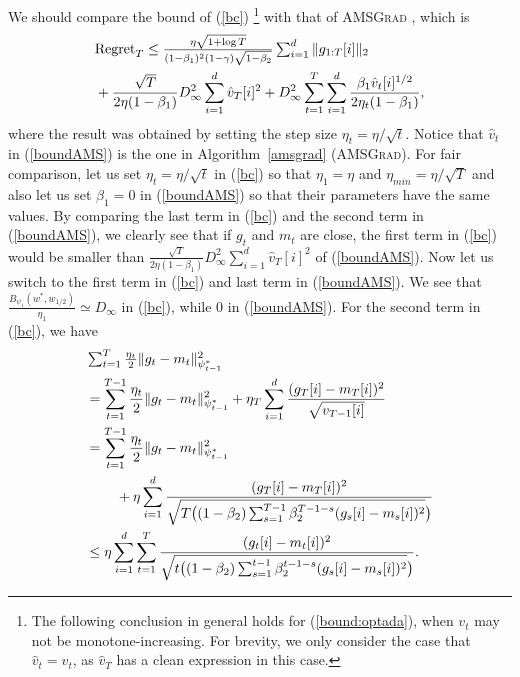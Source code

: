 \documentclass[11pt]{article}
\theoremstyle{k}
\begin{document}
We should compare the bound of (\ref{bc}) \footnote{The following conclusion in general holds for (\ref{bound:optada}), when $v_t$ may not be monotone-increasing. For brevity, we only consider the case that $\hat{v}_t=v_t$, as $\hat{v}_T$ has a clean expression in this case.}
 with that of \textsc{AMSGrad} \cite{RKK18},
which is 
\textit{
\begin{equation} \label{boundAMS}
\begin{aligned}
\textstyle
& \textstyle
 \text{Regret}_T \leq
\textstyle
 \frac{ \eta \sqrt{ 1 + \log T}    }{ (1-\beta_1)^2(1 - \gamma) \sqrt{1 - \beta_2}  } \sum_{i=1}^d \| g_{1:T}[i]  \|_2\\
 &+\frac{\sqrt{T}}{2 \eta (1 - \beta_{1})}
D^2_{\infty} \sum_{i=1}^d \hat{v}_T[i]^2 
 + 
D^2_{\infty} \sum_{t=1}^T \sum_{i=1}^d
\frac{\beta_{1} \hat{v}_t[i]^{1/2} }{2 \eta_t (1-\beta_1)},
\end{aligned}
\end{equation}
}
where the result was obtained by setting the step size $\eta_t = \eta /\sqrt{t}$. 
Notice that $\hat{v}_t$ in (\ref{boundAMS}) is the one in Algorithm~\ref{amsgrad} (\textsc{AMSGrad}).
For fair comparison, let us set $\eta_t=\eta/\sqrt{t}$ in (\ref{bc}) so that $\eta_1=\eta$ and $\eta_{min}= \eta/ \sqrt{T}$ and also let us set $\beta_{1}=0$ in (\ref{boundAMS}) so that their parameters have the same values.
By comparing the last term in (\ref{bc}) and the second term in (\ref{boundAMS}),
we clearly see that if $g_{t}$ and $m_{t}$ are close, the first term in (\ref{bc}) would be 
smaller than $\frac{\sqrt{T}}{2 \eta (1 - \beta_{1})} D^2_{\infty} \sum_{i=1}^d \hat{v}_T[i]^2$
of (\ref{boundAMS}).
Now let us switch to the first term in (\ref{bc}) and last term in (\ref{boundAMS}). We
see that $\frac{ B_{\psi_1}(w^*, w_{1/2}) 
}{\eta_1} \simeq D_{\infty}$ in (\ref{bc}), while $0$ in (\ref{boundAMS}).
For the second term in (\ref{bc}), we have
\begin{align*}
    &\textstyle \sum_{t=1}^T \frac{\eta_t}{2} \|g_t - m_t  \|_{\psi_{t-1}^*}^2\\
    &=\sum_{t=1}^{T-1} \frac{\eta_t}{2} \|g_t - m_t  \|_{\psi_{t-1}^*}^2
    + \eta_T \sum_{i=1}^d \frac{ (g_{T}[i] - m_{T}[i])^2 }{ \sqrt{ v_{T-1}[i]} }\\
    &=\sum_{t=1}^{T-1} \frac{\eta_t}{2} \|g_t - m_t  \|_{\psi_{t-1}^*}^2
    \\
    &\hspace{0.3in}+ \eta \sum_{i=1}^d \frac{ (g_{T}[i] - m_{T}[i])^2 }{ \sqrt{ T \big( (1-\beta_2) \sum_{s=1}^{T-1} \beta_2^{T-1-s} (g_{s}[i] - m_{s}[i])^2 } \big) }\\
    &\leq 
    \eta \sum_{i=1}^d \sum_{t=1}^T \frac{ (g_{t}[i] - m_{t}[i])^2 }{ \sqrt{ t \big( (1-\beta_2) \sum_{s=1}^{t-1} \beta_2^{t-1-s} (g_{s}[i] - m_{s}[i])^2 } \big) }.
\end{align*}
\end{document}
